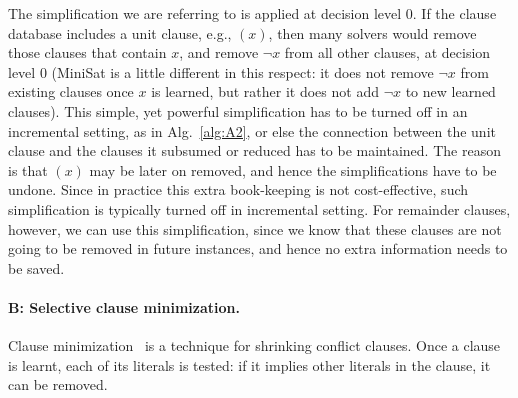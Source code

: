 \documentclass[twoside,11pt]{article}
\begin{document}
The simplification we are referring to is applied at decision level 0. If the clause database includes a unit clause, e.g., $(x)$, then
many solvers would remove those clauses that contain $x$, and remove $\lnot
x$ from all other clauses, at decision level 0 (MiniSat is a little different
in this respect: it does not remove $\lnot x$ from existing clauses once $x$
is learned, but rather it does not add $\lnot x$ to new learned clauses).
This simple, yet powerful simplification has to be turned off in an incremental setting, as in Alg.~\ref{alg:A2}, or else the connection between the unit clause and the clauses it subsumed or reduced has to be maintained. The reason is that $(x)$ may be later on removed, and hence the simplifications have to be undone. Since in practice this extra book-keeping is not cost-effective, such simplification is typically turned off in incremental setting. For remainder clauses, however, we can use this simplification, since we know that these clauses are not going to be removed in future instances, and hence no extra information needs to be saved.


\paragraph{B:  Selective clause minimization.}
Clause minimization~\cite{BKS04,DBLP:conf/sat/SorenssonB09} is a technique for shrinking conflict clauses. Once a clause is learnt,
each of its literals is tested: if it implies other literals in the clause, it can be removed.
\end{document}
